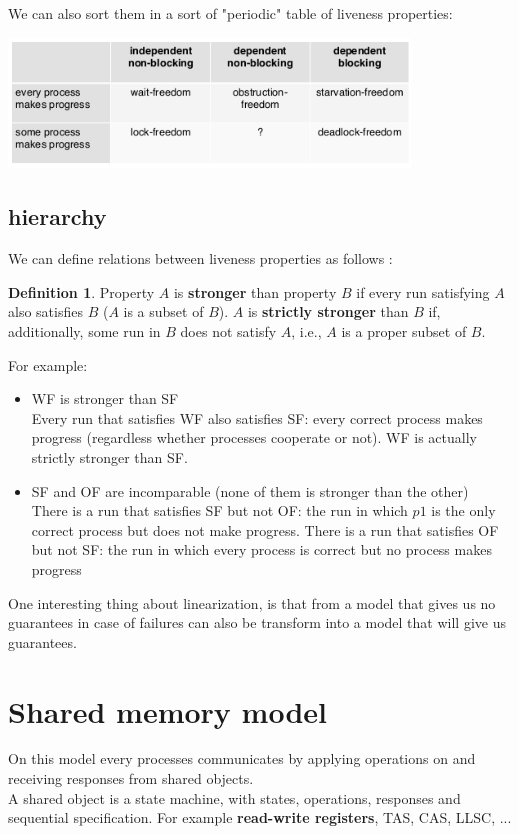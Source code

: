 \documentclass{article}
\theoremstyle{definition}
\newtheorem{definition}{Definition}[section]
\begin{document}
We can also sort them in a sort of "periodic" table of liveness properties:

\begin{center}
\includegraphics[width=0.8\textwidth]{periodic}
\end{center}

\subsection{hierarchy}

We can define relations between liveness properties as follows :
\begin{definition}
Property $A$ is \textbf{stronger} than property $B$ if every run satisfying $A$ also satisfies $B$ ($A$ is a subset of $B$).
$A$ is \textbf{strictly stronger} than $B$ if, additionally, some run in $B$ does not satisfy $A$, i.e., $A$ is a proper subset of $B$.
\end{definition}

For example:
\begin{itemize}
\item WF is stronger than SF \\
Every run that satisfies WF also satisfies SF: every correct process makes progress (regardless whether processes cooperate or not).
WF is actually strictly stronger than SF.
\item SF and OF are incomparable (none of them is stronger than the other)\\
There is a run that satisfies SF but not OF: the run in which $p1$ is the only correct process but does not make progress.
There is a run that satisfies OF but not SF: the run in which every process is correct but no process makes progress
\end{itemize}


One interesting thing about linearization, is that from a model that gives us no guarantees in case of failures can also be transform into a model that will give us guarantees.

\section{Shared memory model}
On this model every processes communicates by applying operations on and receiving responses from shared objects.\\
A shared object is a state machine, with states, operations, responses and sequential specification. For example \textbf{read-write registers}, TAS, CAS, LLSC, ...
\end{document}
